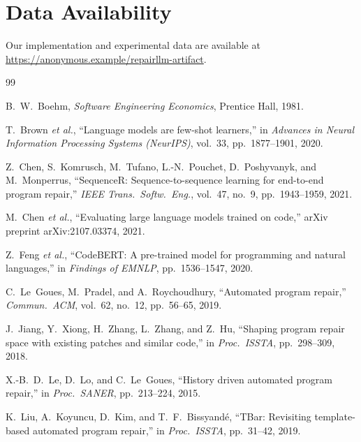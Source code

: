 \section*{Data Availability}
Our implementation and experimental data are available at
\url{https://anonymous.example/repairllm-artifact}.

\begin{thebibliography}{99}

B.~W.~Boehm,
\textit{Software Engineering Economics},
Prentice Hall, 1981.

T.~Brown \textit{et al.},
``Language models are few-shot learners,''
in \textit{Advances in Neural Information Processing Systems (NeurIPS)},
vol.~33, pp.~1877--1901, 2020.

Z.~Chen, S.~Komrusch, M.~Tufano, L.-N.~Pouchet, D.~Poshyvanyk, and
M.~Monperrus,
``SequenceR: Sequence-to-sequence learning for end-to-end program repair,''
\textit{IEEE Trans.\ Softw.\ Eng.}, vol.~47, no.~9, pp.~1943--1959, 2021.

M.~Chen \textit{et al.},
``Evaluating large language models trained on code,''
arXiv preprint arXiv:2107.03374, 2021.

Z.~Feng \textit{et al.},
``CodeBERT: A pre-trained model for programming and natural languages,''
in \textit{Findings of EMNLP}, pp.~1536--1547, 2020.

C.~Le~Goues, M.~Pradel, and A.~Roychoudhury,
``Automated program repair,''
\textit{Commun.\ ACM}, vol.~62, no.~12, pp.~56--65, 2019.

J.~Jiang, Y.~Xiong, H.~Zhang, L.~Zhang, and Z.~Hu,
``Shaping program repair space with existing patches and similar code,''
in \textit{Proc.\ ISSTA}, pp.~298--309, 2018.

X.-B.~D.~Le, D.~Lo, and C.~Le~Goues,
``History driven automated program repair,''
in \textit{Proc.\ SANER}, pp.~213--224, 2015.

K.~Liu, A.~Koyuncu, D.~Kim, and T.~F.~Bissyandé,
``TBar: Revisiting template-based automated program repair,''
in \textit{Proc.\ ISSTA}, pp.~31--42, 2019.


\end{thebibliography}
